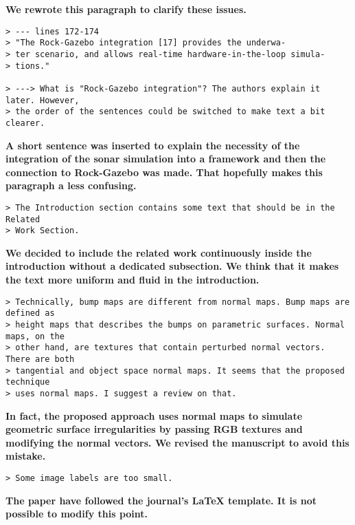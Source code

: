 \documentclass{article}
\begin{document}
\textbf{We rewrote this paragraph to clarify these issues.}

\begin{verbatim}
> --- lines 172-174
> "The Rock-Gazebo integration [17] provides the underwa-
> ter scenario, and allows real-time hardware-in-the-loop simula-
> tions."

> ---> What is "Rock-Gazebo integration"? The authors explain it later. However,
> the order of the sentences could be switched to make text a bit clearer.
\end{verbatim}

\textbf{A short sentence was inserted to explain the necessity of the integration of the
sonar simulation into a framework and then the connection to Rock-Gazebo was made.
That hopefully makes this paragraph a less confusing.}

\begin{verbatim}
> The Introduction section contains some text that should be in the Related
> Work Section.
\end{verbatim}

\textbf{We decided to include the related work continuously inside the introduction
without a dedicated subsection. We think that it makes the text more uniform and fluid
in the introduction.}

\begin{verbatim}
> Technically, bump maps are different from normal maps. Bump maps are defined as
> height maps that describes the bumps on parametric surfaces. Normal maps, on the
> other hand, are textures that contain perturbed normal vectors. There are both
> tangential and object space normal maps. It seems that the proposed technique
> uses normal maps. I suggest a review on that.
\end{verbatim}

\textbf{In fact, the proposed approach uses normal maps to simulate geometric surface
irregularities by passing RGB textures and modifying the normal vectors. We revised the
manuscript to avoid this mistake.}

\begin{verbatim}
> Some image labels are too small.
\end{verbatim}

\textbf{The paper have followed the journal's LaTeX template. It is not possible to modify
this point.}
\end{document}
